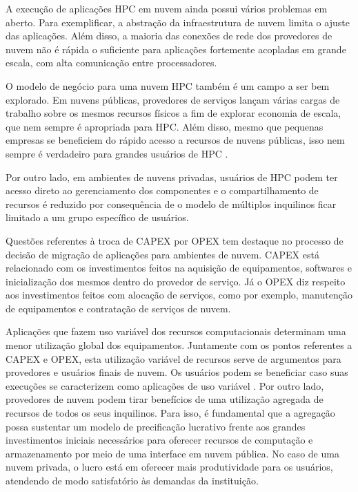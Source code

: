 \documentclass[tese,capa]{texufpel}
\begin{document}
A execução de aplicações HPC em nuvem ainda possui vários problemas em aberto. Para exemplificar, a abstração da infraestrutura de nuvem limita o ajuste das aplicações.  Além disso, a maioria das conexões de rede dos provedores de nuvem não é rápida o suficiente para aplicações fortemente acopladas em grande escala, com alta comunicação entre processadores. 

O modelo de negócio para uma nuvem HPC também é um campo a ser bem explorado. Em nuvens públicas, provedores de serviços lançam várias cargas de trabalho sobre os mesmos recursos físicos a fim de explorar economia de escala, que nem sempre é apropriada para HPC. Além disso, mesmo que pequenas empresas se beneficiem do rápido acesso a recursos de nuvens públicas, isso nem sempre é verdadeiro para grandes usuários de HPC \cite{netto_hpc_2018}. 

Por outro lado, em ambientes de nuvens privadas, usuários de HPC podem ter acesso direto ao gerenciamento dos componentes e o compartilhamento de recursos é reduzido por consequência de o modelo de múltiplos inquilinos ficar limitado a um grupo específico de usuários.

Questões referentes à troca de CAPEX por OPEX tem destaque no processo de decisão de migração de aplicações para ambientes de nuvem. CAPEX está relacionado com os investimentos feitos na aquisição de equipamentos, softwares e inicialização dos mesmos dentro do provedor de serviço. Já o OPEX diz respeito aos investimentos feitos com alocação de serviços, como por exemplo, manutenção de equipamentos e contratação de serviços de nuvem. 

Aplicações que fazem uso variável dos recursos computacionais determinam uma menor utilização global dos equipamentos. Juntamente com os pontos referentes a CAPEX e OPEX, esta utilização variável de recursos serve de argumentos para provedores e usuários finais de nuvem. Os usuários podem se beneficiar caso suas execuções se caracterizem como aplicações de uso variável \cite{guptaEvaluatingImprovingPerformance2016d}. Por outro lado, provedores de nuvem podem tirar benefícios de uma utilização agregada de recursos de todos os seus inquilinos. Para isso, é fundamental que a agregação possa sustentar um modelo de precificação lucrativo frente aos grandes investimentos iniciais necessários para oferecer recursos de computação e armazenamento por meio de uma interface em nuvem pública. No caso de uma nuvem privada, o lucro está em oferecer mais produtividade para os usuários, atendendo de modo satisfatório às demandas da instituição.
\end{document}
